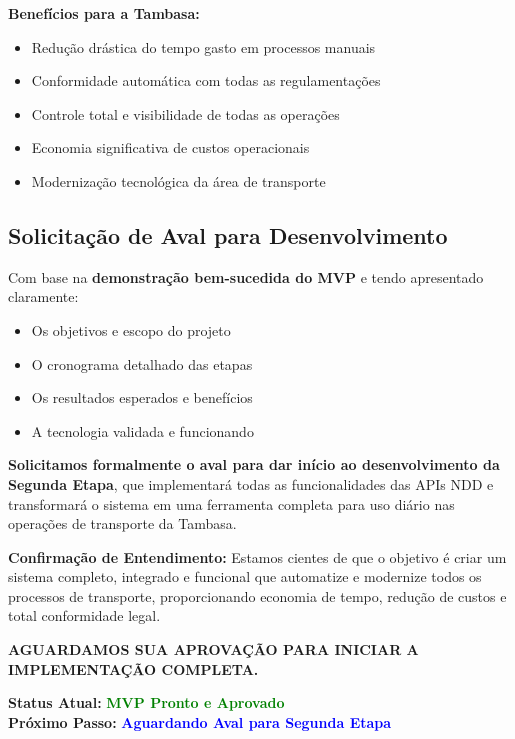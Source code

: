\documentclass[12pt,a4paper]{article}
\begin{document}
\textbf{Benefícios para a Tambasa:}
\begin{itemize}
    \item Redução drástica do tempo gasto em processos manuais
    \item Conformidade automática com todas as regulamentações
    \item Controle total e visibilidade de todas as operações
    \item Economia significativa de custos operacionais
    \item Modernização tecnológica da área de transporte
\end{itemize}

\subsection*{Solicitação de Aval para Desenvolvimento}

Com base na \textbf{demonstração bem-sucedida do MVP} e tendo apresentado claramente:
\begin{itemize}
    \item Os objetivos e escopo do projeto
    \item O cronograma detalhado das etapas
    \item Os resultados esperados e benefícios
    \item A tecnologia validada e funcionando
\end{itemize}

\textbf{Solicitamos formalmente o aval para dar início ao desenvolvimento da Segunda Etapa}, que implementará todas as funcionalidades das APIs NDD e transformará o sistema em uma ferramenta completa para uso diário nas operações de transporte da Tambasa.

\textbf{Confirmação de Entendimento:}
Estamos cientes de que o objetivo é criar um sistema completo, integrado e funcional que automatize e modernize todos os processos de transporte, proporcionando economia de tempo, redução de custos e total conformidade legal.

\textcolor{nddblue}{\textbf{AGUARDAMOS SUA APROVAÇÃO PARA INICIAR A IMPLEMENTAÇÃO COMPLETA.}}

\textbf{Status Atual:} \textcolor{green}{\textbf{MVP Pronto e Aprovado}} \\
\textbf{Próximo Passo:} \textcolor{blue}{\textbf{Aguardando Aval para Segunda Etapa}}
\end{document}
